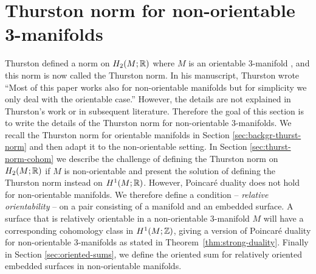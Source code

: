 \section{Thurston norm for non-orientable 3-manifolds}
\label{sec:thur-norm-non-orientable}
Thurston defined a norm on $H_2(M;\mathbb{R})$ where $M$ is an orientable 3-manifold \cite{thurston1986norm}, and this norm is now called the Thurston norm.  In his manuscript, Thurston wrote ``Most of this paper works also for non-orientable manifolds but for simplicity we only deal with the orientable case.''  However, the details are not explained in Thurston's work or in subsequent literature.  Therefore the goal of this section is to write the details of the Thurston norm for non-orientable 3-manifolds.
We recall the Thurston norm for orientable manifolds in Section \ref{sec:backgr-thurst-norm} and then adapt it to the non-orientable setting.
In Section \ref{sec:thurst-norm-cohom} we describe the challenge of defining the Thurston norm on $H_2(M;\mathbb{R})$ if $M$ is non-orientable and present the solution of defining the Thurston norm instead on $H^1(M;\mathbb{R})$.
However, Poincar\'e duality does not hold for non-orientable manifolds.
We therefore define a condition -- {\it relative orientability} -- on a pair consisting of a manifold and an embedded surface.
A surface that is relatively orientable in a non-orientable 3-manifold $M$ will have a corresponding cohomology class in $H^1(M;\mathbb{Z})$, giving a version of Poincar\'e duality for non-orientable 3-manifolds as stated in Theorem~\ref{thm:strong-duality}.
Finally in Section \ref{sec:oriented-sums}, we define the oriented sum for relatively oriented embedded surfaces in non-orientable manifolds.



